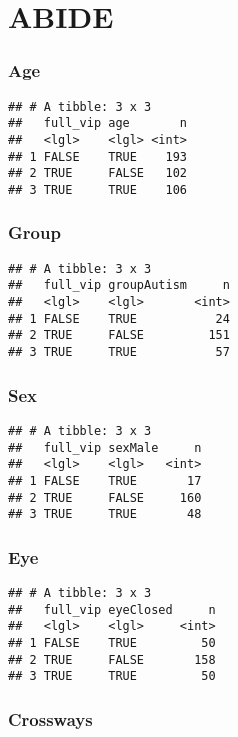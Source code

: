 \documentclass[
]{article}
\begin{document}
\hypertarget{abide}{%
\section{ABIDE}\label{abide}}

\hypertarget{age-1}{%
\subsubsection{Age}\label{age-1}}

\begin{verbatim}
## # A tibble: 3 x 3
##   full_vip age       n
##   <lgl>    <lgl> <int>
## 1 FALSE    TRUE    193
## 2 TRUE     FALSE   102
## 3 TRUE     TRUE    106
\end{verbatim}

\hypertarget{group-1}{%
\subsubsection{Group}\label{group-1}}

\begin{verbatim}
## # A tibble: 3 x 3
##   full_vip groupAutism     n
##   <lgl>    <lgl>       <int>
## 1 FALSE    TRUE           24
## 2 TRUE     FALSE         151
## 3 TRUE     TRUE           57
\end{verbatim}

\hypertarget{sex}{%
\subsubsection{Sex}\label{sex}}

\begin{verbatim}
## # A tibble: 3 x 3
##   full_vip sexMale     n
##   <lgl>    <lgl>   <int>
## 1 FALSE    TRUE       17
## 2 TRUE     FALSE     160
## 3 TRUE     TRUE       48
\end{verbatim}

\hypertarget{eye}{%
\subsubsection{Eye}\label{eye}}

\begin{verbatim}
## # A tibble: 3 x 3
##   full_vip eyeClosed     n
##   <lgl>    <lgl>     <int>
## 1 FALSE    TRUE         50
## 2 TRUE     FALSE       158
## 3 TRUE     TRUE         50
\end{verbatim}

\hypertarget{crossways}{%
\subsubsection{Crossways}\label{crossways}}
\end{document}
